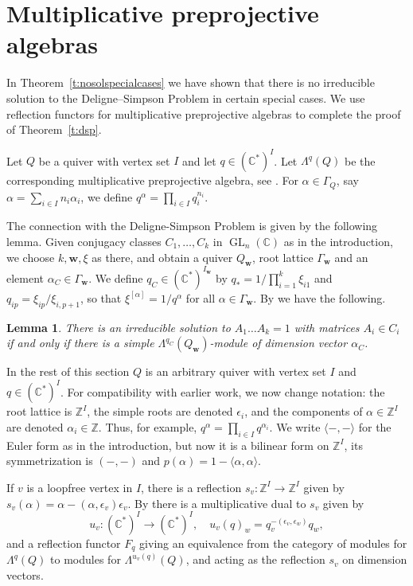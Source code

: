 \documentclass[12pt,a4paper]{amsart}
\theoremstyle{plain}
\newtheorem{lem}[thm]{Lemma}
\newcommand{\C}{\mathbb C}
\newcommand{\Z}{\mathbb Z}
\DeclareMathOperator{\GL}{GL}
\newcommand{\bw}{\mathbf w}
\begin{document}
\section{Multiplicative preprojective algebras}
\label{s:mainproof}


In Theorem~\ref{t:nosolspecialcases} we have shown that there is no irreducible solution to the Deligne--Simpson Problem in certain special cases. We use reflection functors for multiplicative preprojective algebras to complete the proof of Theorem~\ref{t:dsp}.

Let $Q$ be a quiver with vertex set $I$ and let $q \in (\C^*)^I$. Let $\Lambda^q(Q)$ be the corresponding multiplicative preprojective algebra, see \cite{CBSh}. For $\alpha\in \Gamma_Q$, say $\alpha = \sum_{i\in I} n_i \alpha_i$, we define $q^\alpha = \prod_{i\in I} q_i^{n_i}$.

The connection with the Deligne-Simpson Problem is given by the following lemma. Given conjugacy classes $C_1,\dots,C_k$ in $\GL_n(\C)$ as in the introduction, we choose $k,\bw,\xi$ as there, and obtain a quiver $Q_\bw$, root lattice $\Gamma_\bw$ and an element $\alpha_C \in \Gamma_\bw$. We define $q_C \in (\C^*)^{I_\bw}$ by $q_* = 1/\prod_{i=1}^k \xi_{i1}$ and $q_{ip} = \xi_{ip}/\xi_{i,p+1}$, so that $\xi^{[\alpha]} = 1/q^\alpha$ for all $\alpha\in \Gamma_\bw$. By \cite[Lemma 8.3]{CBSh} we have the following.


\begin{lem}
\label{l:dspmulcorr}
There is an irreducible solution to $A_1\dots A_k = 1$ with matrices $A_i\in C_i$ if and only if there is a simple $\Lambda^{q_C}(Q_\bw)$-module of dimension vector $\alpha_C$.
\end{lem}


In the rest of this section $Q$ is an arbitrary quiver with vertex set $I$ and $q\in(\C^*)^I$. For compatibility with earlier work, we now change notation: the root lattice is $\Z^I$, the simple roots are denoted $\epsilon_i$, and the components of $\alpha\in\Z^I$ are denoted $\alpha_i\in\Z$. Thus, for example, $q^\alpha = \prod_{i\in I} q^{\alpha_i}$. We write $\langle -,-\rangle$ for the Euler form as in the introduction, but now it is a bilinear form on $\Z^I$, its symmetrization is $(-,-)$ and $p(\alpha) = 1 -\langle \alpha,\alpha\rangle$.

If $v$ is a loopfree vertex in $I$, there is a reflection $s_v :\Z^I\to \Z^I$ given by $s_v(\alpha) = \alpha - (\alpha,\epsilon_v)\epsilon_v$. By \cite{CBSh} there is a multiplicative dual to $s_v$ given by 
\[
u_v : (\C^*)^I\to (\C^*)^I, 
\quad
u_v(q)_w = q_v^{-(\epsilon_v,\epsilon_w)} q_w,
\]
and a reflection functor $F_q$ giving an equivalence from the category of modules for $\Lambda^q(Q)$ to modules for $\Lambda^{u_v(q)}(Q)$, and acting as the reflection $s_v$ on dimension vectors.
\end{document}
